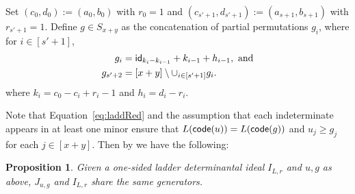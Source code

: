 \documentclass[12pt]{amsart}
\newtheorem{proposition}[theorem]{Proposition}
\theoremstyle{definition}
\theoremstyle{remark}
\numberwithin{equation}{section}
\newcommand{\code}{{\sf code}}
\begin{document}
Set 
$(c_0,d_0):=(a_0,b_0)$ with $r_0=1$ and 
$(c_{s'+1},d_{s'+1}):=(a_{s+1},b_{s+1})$ with $r_{s'+1}=1$.
Define $g\in S_{x+y}$ as the concatenation of partial permutations $g_i$, 
where for $i\in[s'+1]$,
\begin{align}
\label{eqn:oneSidedPatch2}
\begin{split}
    g_{i}&= {\sf id}_{k_i-k_{i-1}}+k_{i-1}+h_{i-1}, \text{ and} \\
g_{s'+2}&=[x+y]\setminus \cup_{i\in[s'+1]}g_i.
\end{split}
\end{align}
where $k_i=c_0-c_i+r_i-1$ and $h_i=d_i-r_i$.

Note that Equation~\eqref{eq:laddRed} and the assumption that each indeterminate appears in at least one minor ensure that $L(\code{(u)})=L(\code{(g)})$ and $u_j\geq g_j$ for each $j\in[x+y]$. 
Then 
by \cite[Theorem 4.7.3]{GM} we have the following:
\begin{proposition}\label{prop:KLladder}
Given a one-sided ladder determinantal ideal $I_{L,r}$ and $u,g$ as above,
$J_{u,g}$ and $I_{L,r}$ share the same generators.
\end{proposition}
\end{document}
